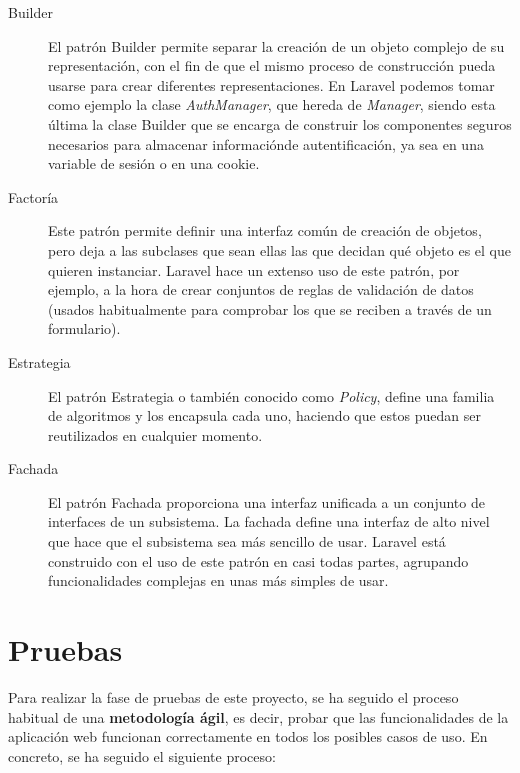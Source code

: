 \begin{description}
    \item [Builder] El patrón Builder permite separar la creación de un objeto complejo de su representación, con el fin de que el mismo proceso de construcción pueda usarse para crear diferentes representaciones. En Laravel podemos tomar como ejemplo la clase \textit{AuthManager}, que hereda de \textit{Manager}, siendo esta última la clase Builder que se encarga de construir los componentes seguros necesarios para almacenar informaciónde autentificación, ya sea en una variable de sesión o en una cookie.
    \item [Factoría] Este patrón permite definir una interfaz común de creación de objetos, pero deja a las subclases que sean ellas las que decidan qué objeto es el que quieren instanciar. Laravel hace un extenso uso de este patrón, por ejemplo, a la hora de crear conjuntos de reglas de validación de datos (usados habitualmente para comprobar los que se reciben a través de un formulario).
    \item [Estrategia] El patrón Estrategia o también conocido como \textit{Policy}, define una familia de algoritmos y los encapsula cada uno, haciendo que estos puedan ser reutilizados en cualquier momento.
    \item [Fachada] El patrón Fachada proporciona una interfaz unificada a un conjunto de interfaces de un subsistema. La fachada define una interfaz de alto nivel que hace que el subsistema sea más sencillo de usar. Laravel está construido con el uso de este patrón en casi todas partes, agrupando funcionalidades complejas en unas más simples de usar.
\end{description}

\section{Pruebas}
Para realizar la fase de pruebas de este proyecto, se ha seguido el proceso habitual de una \textbf{metodología ágil}, es decir, probar que las funcionalidades de la aplicación web funcionan correctamente en todos los posibles casos de uso. En concreto, se ha seguido el siguiente proceso:

